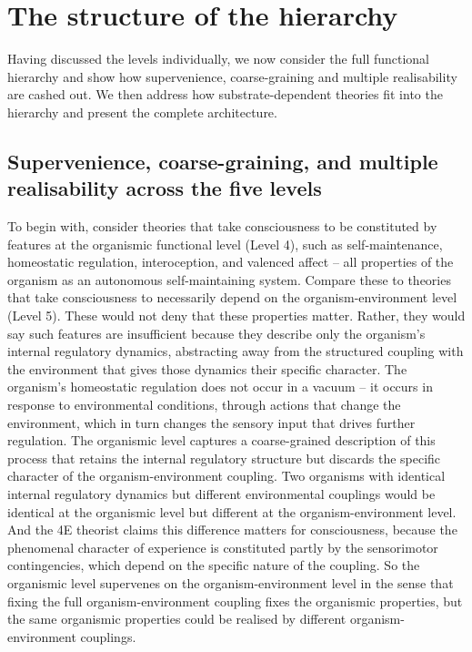 \documentclass[11pt, a4paper, onecolumn, gdm]{google}
\begin{document}
\section{The structure of the hierarchy}\label{the-structure-of-the-hierarchy}

Having discussed the levels individually, we now consider the full functional hierarchy and show how supervenience, coarse-graining and multiple realisability are cashed out.
We then address how substrate-dependent theories fit into the hierarchy and present the complete architecture.

\subsection{Supervenience, coarse-graining, and multiple realisability across the five levels}\label{supervenience-coarse-graining-and-multiple-realisability-across-the-five-levels}

To begin with, consider theories that take consciousness to be constituted by features at the organismic functional level (Level 4), such as self-maintenance, homeostatic regulation, interoception, and valenced affect -- all properties of the organism as an autonomous self-maintaining system.
Compare these to theories that take consciousness to necessarily depend on the organism-environment level (Level 5).
These would not deny that these properties matter.
Rather, they would say such features are insufficient because they describe only the organism's internal regulatory dynamics, abstracting away from the structured coupling with the environment that gives those dynamics their specific character.
The organism's homeostatic regulation does not occur in a vacuum -- it occurs in response to environmental conditions, through actions that change the environment, which in turn changes the sensory input that drives further regulation.
The organismic level captures a coarse-grained description of this process that retains the internal regulatory structure but discards the specific character of the organism-environment coupling.
Two organisms with identical internal regulatory dynamics but different environmental couplings would be identical at the organismic level but different at the organism-environment level.
And the 4E theorist claims this difference matters for consciousness, because the phenomenal character of experience is constituted partly by the sensorimotor contingencies, which depend on the specific nature of the coupling.
So the organismic level supervenes on the organism-environment level in the sense that fixing the full organism-environment coupling fixes the organismic properties, but the same organismic properties could be realised by different organism-environment couplings.
\end{document}
